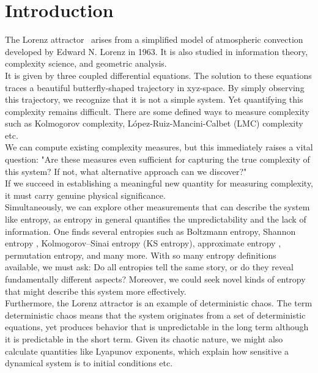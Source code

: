 \documentclass[%
reprint,
amsmath,amssymb,
aps,
floatfix,
]{revtex4-2}
\begin{document}
	\section{\label{sec:level1}Introduction}
	The Lorenz attractor~\cite{lorenz2017deterministic} arises from a simplified model of atmospheric convection developed by Edward N. Lorenz in 1963. It is also studied in information theory, complexity science, and geometric analysis.\\
	It is given by three coupled differential equations. The solution to these equations traces a beautiful butterfly-shaped trajectory in xyz-space. By simply observing this trajectory, we recognize that it is not a simple system. Yet quantifying this complexity remains difficult. There are some defined ways to measure complexity such as Kolmogorov complexity\cite{kolmogorov1965three}, López-Ruiz-Mancini-Calbet (LMC) complexity\cite{lopez1995statistical} etc.\\
	We can compute existing complexity measures, but this immediately raises a vital question: "Are these measures even sufficient for capturing the true complexity of this system? If not, what alternative approach can we discover?"\\
	If we succeed in establishing a meaningful new quantity for measuring complexity, it must carry genuine physical significance.\\
	Simultaneously, we can explore other measurements that can describe the system like entropy, as entropy in general quantifies the unpredictability and the lack of information. One finds several entropies such as Boltzmann entropy, Shannon entropy \cite{shannon1948mathematical}, Kolmogorov–Sinai entropy (KS entropy), approximate entropy \cite{pincus1991approximate}, permutation entropy\cite{bandt2002permutation}, and many more. With so many entropy definitions available, we must ask: Do all entropies tell the same story, or do they reveal fundamentally different aspects? Moreover, we could seek novel kinds of entropy that might describe this system more effectively.\\
	Furthermore, the Lorenz attractor is an example of deterministic chaos. The term deterministic chaos means that the system originates from a set of deterministic equations, yet produces behavior that is unpredictable in the long term although it is predictable in the short term. Given its chaotic nature, we might also calculate quantities like Lyapunov exponents\cite{wolf1985determining}, which explain how sensitive a dynamical system is to initial conditions etc.\\
\end{document}

